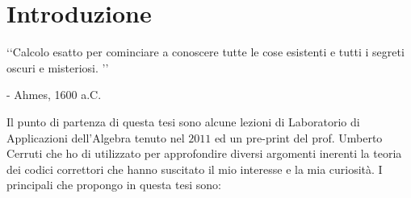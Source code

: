 

\chapter*{Introduzione}

\begin{flushright}
\lq\lq Calcolo esatto per cominciare a conoscere tutte le cose esistenti e tutti i segreti oscuri e misteriosi. \rq\rq
\vspace*{0.3cm}

- Ahmes, 1600 a.C.
\end{flushright}

\vspace*{0.6cm}

Il punto di partenza di questa tesi sono alcune lezioni di Laboratorio di Applicazioni dell'Algebra tenuto nel $2011$ ed un pre-print del prof. Umberto Cerruti \cite{cerruti} che ho di utilizzato per approfondire diversi argomenti inerenti la teoria dei codici correttori che hanno suscitato il mio interesse e la mia curiosità. I principali che propongo in questa tesi sono:
